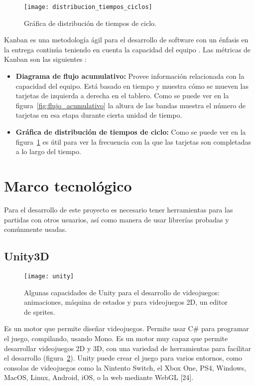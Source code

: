 \begin{figure}[h!]
    \centering
    \texttt{[image: distribucion\_tiempos\_ciclos]}
    \caption{Gráfica de distribución de tiempos de ciclo.}
    \label{fig:distribucion_tiempos_ciclos}
\end{figure}

Kanban es una metodología ágil para el desarrollo de software con un énfasis 
en la entrega continúa teniendo en cuenta la capacidad del equipo \cite{romano-a}. 
Las métricas de Kanban son las siguientes \cite{najera2018a}:

\begin{itemize}
    \item \textbf{Diagrama de flujo acumulativo:} Provee información relacionada con la capacidad del equipo. Está basado en tiempo y muestra cómo se mueven las tarjetas de izquierda a derecha en el tablero. Como se puede ver en la figura~\ref{fig:flujo_acumulativo} la altura de las bandas muestra el número de tarjetas en esa etapa durante cierta unidad de tiempo.
    \item \textbf{Gráfica de distribución de tiempos de ciclo:} Como se puede ver en la figura~\ref{fig:distribucion_tiempos_ciclos} es útil para ver la frecuencia con la que las tarjetas son completadas a lo largo del tiempo.
\end{itemize}

\section{Marco tecnológico}
Para el desarrollo de este proyecto es necesario tener herramientas para las partidas con otros usuarios, así como manera de usar librerías probadas y comúnmente usadas.

\subsection{Unity3D}
\begin{figure}[h!]
    \centering
    \texttt{[image: unity]}
        \caption{Algunas capacidades de Unity para el desarrollo de videojuegos: animaciones, máquina de estados y para videojuegos 2D, un editor de sprites.}
        \label{fig:unity_screenshot}
\end{figure}
Es un motor que permite diseñar videojuegos. Permite usar C\# para programar el juego, compilando, usando Mono\cite{unity2019}. Es un motor muy capaz que permite desarrollar videojuegos 2D y 3D, con una variedad de herramientas para facilitar el desarrollo (figura~\ref{fig:unity_screenshot}).
Unity puede crear el juego para varios entornos, como consolas de videojuegos como la Nintento Switch, el Xbox One, PS4, Windows, MacOS, Linux, Android, iOS, o la web mediante WebGL [24].


